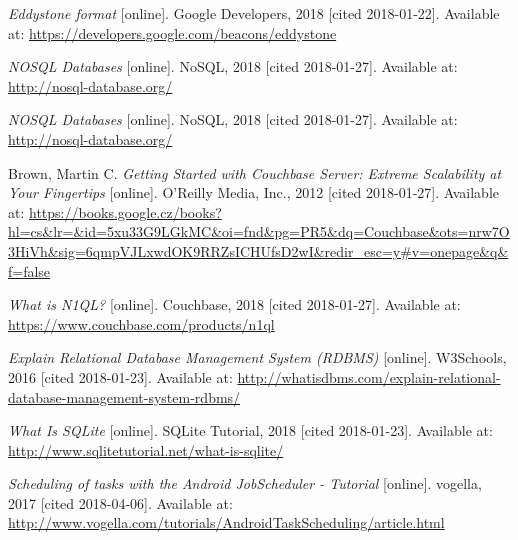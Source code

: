 \begin{thebibliography}{10}
\textit{Eddystone format} [online]. Google Developers, 2018 [cited 2018-01-22]. Available at: \url{https://developers.google.com/beacons/eddystone}

\textit{NOSQL Databases} [online]. NoSQL, 2018 [cited 2018-01-27]. Available at: \url{http://nosql-database.org/}

\textit{NOSQL Databases} [online]. NoSQL, 2018 [cited 2018-01-27]. Available at: \url{http://nosql-database.org/}

Brown, Martin C. \textit{Getting Started with Couchbase Server: Extreme Scalability at Your Fingertips} [online]. O'Reilly Media, Inc., 2012 [cited 2018-01-27]. Available at: \url{https://books.google.cz/books?hl=cs&lr=&id=5xu33G9LGkMC&oi=fnd&pg=PR5&dq=Couchbase&ots=nrw7O3HiVh&sig=6qmpVJLxwdOK9RRZsICHUfsD2wI&redir_esc=y#v=onepage&q&f=false}

\textit{What is N1QL?} [online]. Couchbase, 2018 [cited 2018-01-27]. Available at: \url{https://www.couchbase.com/products/n1ql}

\textit{Explain Relational Database Management System (RDBMS)} [online]. W3Schools, 2016 [cited 2018-01-23]. Available at: \url{http://whatisdbms.com/explain-relational-database-management-system-rdbms/}

\textit{What Is SQLite} [online]. SQLite Tutorial, 2018 [cited 2018-01-23]. Available at: \url{http://www.sqlitetutorial.net/what-is-sqlite/}

\textit{Scheduling of tasks with the Android JobScheduler - Tutorial} [online]. vogella, 2017 [cited 2018-04-06]. Available at: \url{http://www.vogella.com/tutorials/AndroidTaskScheduling/article.html}

\end{thebibliography}